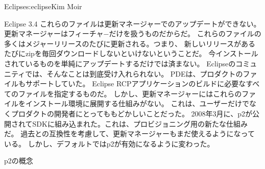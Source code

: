 \begin{aosachapter}{Eclipse}{s:eclipse}{Kim Moir}
\begin{aosasect1}{Eclipse 3.4}
これらのファイルは更新マネージャーでのアップデートができない。
更新マネージャーはフィーチャ−だけを扱うものだからだ。
これらのファイルの多くはメジャーリリースのたびに更新される。つまり、
新しいリリースがあるたびにzipを毎回ダウンロードしないといけないということだ。
今インストールされているものを単純にアップデートするだけでは済まない。
Eclipseのコミュニティでは、そんなことは到底受け入れられない。
PDEは、プロダクトのファイルもサポートしていた。
Eclipse RCPアプリケーションのビルドに必要なすべてのファイルを指定するものだ。
しかし、更新マネージャーにはこれらのファイルをインストール環境に展開する仕組みがない。
これは、ユーザーだけでなくプロダクトの開発者にとってももどかしいことだった。
2008年3月に、p2が公開されてSDKに組み込まれた。これは、プロビジョニング用の新たな仕組みだ。
過去との互換性を考慮して、更新マネージャーもまだ使えるようになっている。
しかし、デフォルトではp2が有効になるように変わった。

\begin{aosasect2}{p2の概念}


\end{aosasect2}
\end{aosasect1}
\end{aosachapter}
